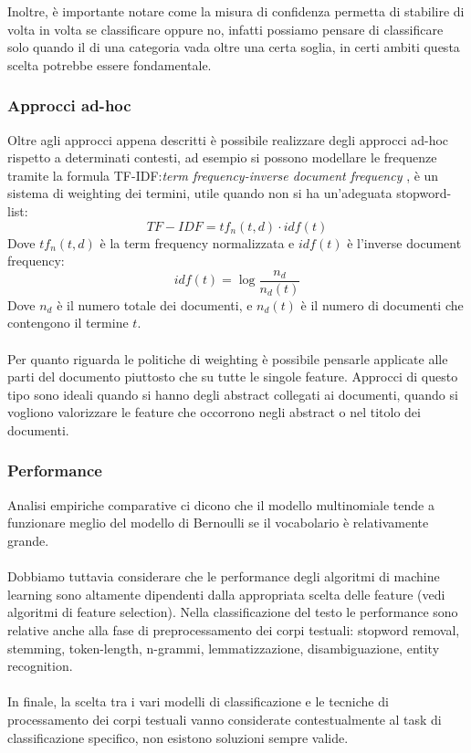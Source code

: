 \documentclass{article}
\theoremstyle{plain}
\theoremstyle{definition}
\begin{document}
Inoltre, è importante notare come la misura di confidenza permetta di stabilire di volta in volta se classificare oppure no, infatti possiamo pensare di classificare solo quando il  di una categoria vada oltre una certa soglia, in certi ambiti questa scelta potrebbe essere fondamentale.
\subsubsection{Approcci ad-hoc}
Oltre agli approcci appena descritti è possibile realizzare degli approcci ad-hoc rispetto a determinati contesti, ad esempio si possono modellare le frequenze tramite la formula TF-IDF:\textit{term frequency-inverse document frequency}\footnotemark
{}, è un sistema di weighting dei termini, utile quando non si ha un'adeguata stopword-list: 
$$TF-IDF=tf_n(t,d) \cdot idf(t)$$
Dove $tf_n(t,d)$ è la term frequency normalizzata e $idf(t)$ è l'inverse document frequency:
$$ idf(t)=\log{\frac{n_d}{n_d(t)}} $$
Dove $n_d$ è il numero totale dei documenti, e $n_d(t)$ è il numero di documenti che contengono il termine $t$.
\\
\\
Per quanto riguarda le politiche di weighting è possibile pensarle applicate alle parti del documento piuttosto che su tutte le singole feature. Approcci di questo tipo sono ideali quando si hanno degli abstract collegati ai documenti, quando si vogliono valorizzare le feature che occorrono negli abstract o nel titolo dei documenti.
\subsubsection{Performance}
Analisi empiriche comparative ci dicono che il modello multinomiale tende a funzionare meglio del modello di Bernoulli se il vocabolario è relativamente grande.\footnotemark
{}
\\
\\
Dobbiamo tuttavia considerare che le performance degli algoritmi di machine learning sono altamente dipendenti dalla appropriata scelta delle feature (vedi algoritmi di feature selection). Nella classificazione del testo le performance sono relative anche alla fase di preprocessamento dei corpi testuali: stopword removal, stemming, token-length, n-grammi, lemmatizzazione, disambiguazione, entity recognition. 
\footnotemark
{}
\\
\\
In finale, la scelta tra i vari modelli di classificazione e le tecniche di processamento dei corpi testuali vanno considerate contestualmente al task di classificazione specifico, non esistono soluzioni sempre valide.
\newpage
\end{document}
